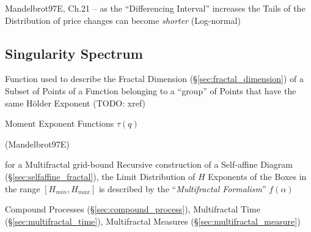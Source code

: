 Mandelbrot97E, Ch.21 -- as the ``Differencing Interval'' increases the Tails of
the Distribution of price changes can become \emph{shorter} (Log-normal)



\subsection{Singularity Spectrum}\label{sec:singularity_spectrum}

Function used to describe the Fractal Dimension (\S\ref{sec:fractal_dimension})
of a Subset of Points of a Function belonging to a ``group'' of Points that have
the same H\"older Exponent (TODO: xref)

Moment Exponent Functions $\tau(q)$

(Mandelbrot97E)

for a Multifractal grid-bound Recursive construction of a Self-affine Diagram
(\S\ref{sec:selfaffine_fractal}), the Limit Distribution of $H$ Exponents of the
Boxes in the range $[H_{min}, H_{max}]$ is described by the
``\emph{Multifractal Formalism}'' $f(\alpha)$

\fist Compound Processes (\S\ref{sec:compound_process}), Multifractal Time
(\S\ref{sec:multifractal_time}), Multifractal Measures
(\S\ref{sec:multifractal_measure})
